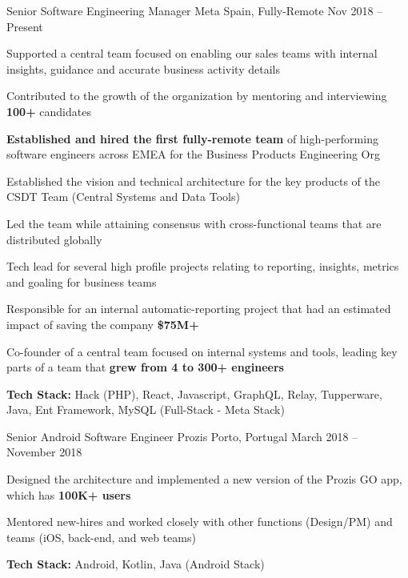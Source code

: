 \documentclass[]{awesome-cv}
\begin{document}
	
\vspace{-8mm}
\begin{cventries}

\vspace{-2mm}

\cventry
	{Senior Software Engineering Manager}
	{Meta}
	{Spain, Fully-Remote}
	{Nov 2018 – Present}
	{\begin{cvitems}
		\item {Supported a central team focused on enabling our sales teams with internal insights, guidance and accurate business activity details}
		\item {Contributed to the growth of the organization by mentoring and interviewing \textbf{100+} candidates}
		\item {\textbf{Established and hired the first fully-remote team} of high-performing software engineers across EMEA for the Business Products Engineering Org}
		\item {Established the vision and technical architecture for the key products of the CSDT Team (Central Systems and Data Tools)}
		\item {Led the team while attaining consensus with cross-functional teams that are distributed globally}
		\item {Tech lead for several high profile projects relating to reporting, insights, metrics and goaling for business teams}
		\item {Responsible for an internal automatic-reporting project that had an estimated impact of saving the company  \textbf{\$75M+}}
		\item {Co-founder of a central team focused on internal systems and tools, leading key parts of a team that \textbf{grew from 4 to 300+ engineers}}
		\item {\textbf{Tech Stack:} Hack (PHP), React, Javascript, GraphQL, Relay, Tupperware, Java, Ent Framework, MySQL  (Full-Stack - Meta Stack)}
	\end{cvitems}}

	\vspace{-4mm}
	\cventry
	{Senior Android Software Engineer}
	{Prozis}
	{Porto, Portugal}
	{March 2018 – November 2018}
	{\begin{cvitems}
		\item {Designed the architecture and implemented a new version of the Prozis GO app, which has \textbf{100K+ users}}
		\item {Mentored new-hires and worked closely with other functions (Design/PM) and teams (iOS, back-end, and web teams)}
		\item {\textbf{Tech Stack:} Android, Kotlin, Java (Android Stack)}
	\end{cvitems}}
	


\end{cventries}
\end{document}

